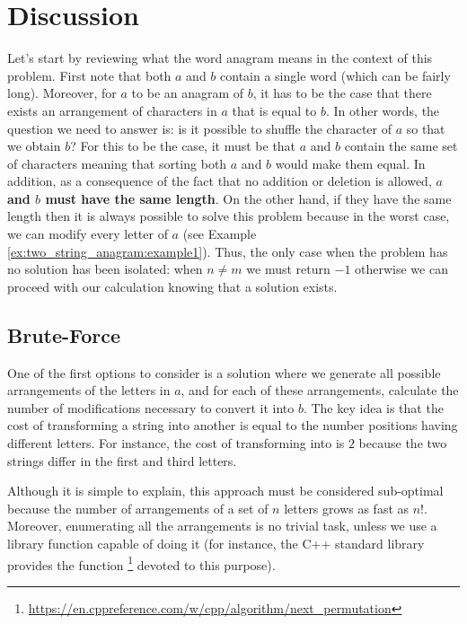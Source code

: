 \section{Discussion}

Let's start by reviewing what the word anagram means in the context of this problem. First note that both $a$ and $b$ contain a single word (which can be fairly long).
Moreover, for $a$ to be an anagram
of $b$, it has to be the case that there exists an arrangement of characters in $a$ that is equal to $b$.
In other words, the question we need to answer is: is it possible to shuffle the character of $a$ so that we obtain $b$?
For this to be the case, it must be that $a$ and $b$ contain the same set of characters meaning that sorting both $a$ and $b$ would make them equal.
In addition, as a consequence of the fact that no addition or deletion
is allowed, \textbf{$a$ and $b$ must have the same length}. 
On the other hand, if they have the same length then it is always
possible to solve this problem because in the worst case, we can modify every letter of $a$ (see Example \ref{ex:two_string_anagram:example1}).
Thus, the only case when the problem has no solution has been isolated: when $n \neq m$ we must return $-1$ otherwise we can proceed with our calculation knowing that a solution exists.

\subsection{Brute-Force}
\label{sec:anagrams:bruteforce}
One of the first options to consider is a solution where we generate all possible arrangements of the letters in $a$, and for each of these arrangements, calculate the number of modifications necessary to convert it into $b$. 
The key idea is that the cost of transforming a string into another is equal to the number positions having different letters. 
For instance, the cost of transforming \textit{} into \textit{} is $2$ because the two strings differ in the first and third letters. 

Although it is simple to explain, this approach must be considered sub-optimal because the number of arrangements of a set of $n$ letters grows as fast as $n!$.
Moreover, enumerating all the arrangements is no trivial task, unless we use a  library function capable of doing it (for instance, the C++ standard library provides the function \footnote{\href{https://en.cppreference.com/w/cpp/algorithm/next_permutation}{https://en.cppreference.com/w/cpp/algorithm/next\_permutation}} devoted to this purpose).


